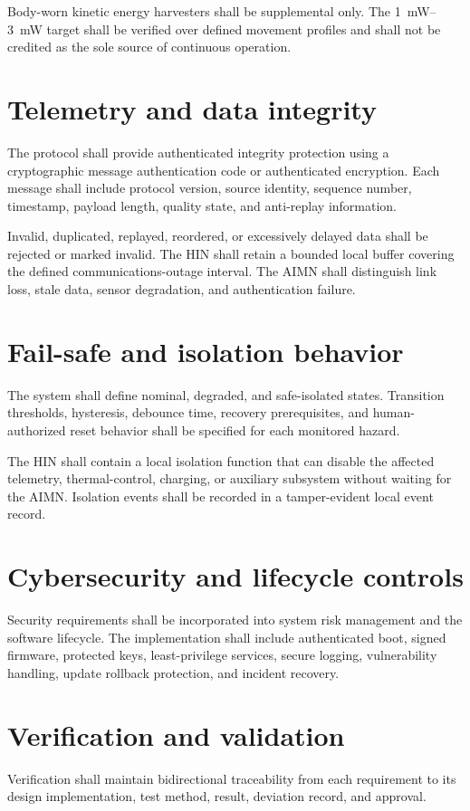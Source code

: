 \documentclass[11pt,a4paper]{article}
\begin{document}
Body-worn kinetic energy harvesters shall be supplemental only. The \SIrange{1}{3}{\milli\watt} target shall be verified over defined movement profiles and shall not be credited as the sole source of continuous operation.

\section{Telemetry and data integrity}\label{sec:telemetry}
The protocol shall provide authenticated integrity protection using a cryptographic message authentication code or authenticated encryption. Each message shall include protocol version, source identity, sequence number, timestamp, payload length, quality state, and anti-replay information.

Invalid, duplicated, replayed, reordered, or excessively delayed data shall be rejected or marked invalid. The HIN shall retain a bounded local buffer covering the defined communications-outage interval. The AIMN shall distinguish link loss, stale data, sensor degradation, and authentication failure.

\section{Fail-safe and isolation behavior}\label{sec:failsafe}
The system shall define nominal, degraded, and safe-isolated states. Transition thresholds, hysteresis, debounce time, recovery prerequisites, and human-authorized reset behavior shall be specified for each monitored hazard.

The HIN shall contain a local isolation function that can disable the affected telemetry, thermal-control, charging, or auxiliary subsystem without waiting for the AIMN. Isolation events shall be recorded in a tamper-evident local event record.

\section{Cybersecurity and lifecycle controls}\label{sec:cybersecurity}
Security requirements shall be incorporated into system risk management and the software lifecycle. The implementation shall include authenticated boot, signed firmware, protected keys, least-privilege services, secure logging, vulnerability handling, update rollback protection, and incident recovery.

\section{Verification and validation}\label{sec:verification}
Verification shall maintain bidirectional traceability from each requirement to its design implementation, test method, result, deviation record, and approval.
\end{document}

